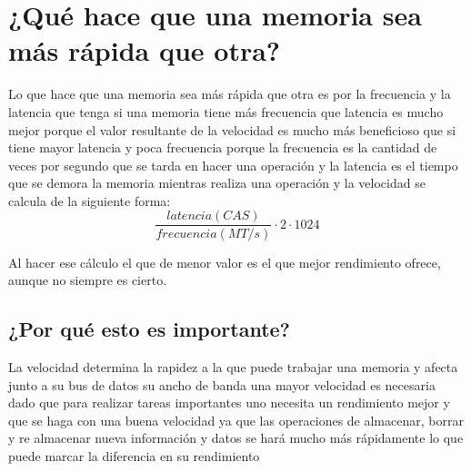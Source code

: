 \documentclass{article}
\begin{document}
\section{¿Qué hace que una memoria sea más rápida que otra?}
        \vspace{0.8cm}
Lo que hace que una memoria sea más rápida que otra es por la frecuencia y la latencia que tenga si una memoria tiene más frecuencia que latencia es mucho mejor porque el valor resultante de la velocidad es mucho más beneficioso que si tiene mayor latencia y poca frecuencia porque la frecuencia es la  cantidad de veces por segundo que se tarda en hacer una operación y la latencia es el tiempo que se demora la memoria mientras realiza una operación y la velocidad se calcula de la siguiente forma: \cite{frecuencia_latencia}
        \vspace{0.8cm}
$$\frac{latencia(CAS)}{frecuencia(MT/s )}\cdot2\cdot1024$$ \cite{formula}
        \vspace{0.8cm}
        
Al hacer ese cálculo el que de menor valor es el que mejor rendimiento ofrece, aunque no siempre es cierto.\cite{frecuencia_latencia}
\subsection{¿Por qué esto es importante?}
        \vspace{0.8cm}
La velocidad determina la rapidez a la que puede trabajar una memoria y afecta junto a su bus de datos su ancho de banda una mayor velocidad es necesaria dado que para realizar tareas importantes uno necesita un rendimiento mejor y que se haga con una buena velocidad ya que las operaciones de almacenar, borrar y re almacenar nueva información y datos se hará mucho más rápidamente lo que puede marcar la diferencia en su rendimiento 
\cite{memoria_imp}





\newpage


\end{document}
